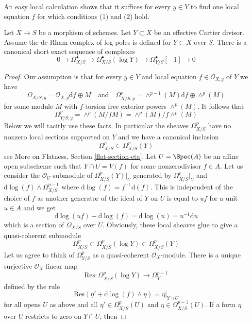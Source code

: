 \noindent
An easy local calculation shows that it suffices for every $y \in Y$
to find one local equation $f$ for which conditions (1) and (2) hold.

\begin{lemma}
\label{lemma-log-complex}
Let $X \to S$ be a morphism of schemes. Let $Y \subset X$ be an
effective Cartier divisor.
Assume the de Rham complex of log poles is defined for $Y \subset X$ over $S$.
There is a canonical short exact sequence
of complexes
$$
0 \to \Omega^\bullet_{X/S} \to
\Omega^\bullet_{X/S}(\log Y) \to
\Omega^\bullet_{Y/S}[-1] \to 0
$$
\end{lemma}

\begin{proof}
Our assumption is that for every $y \in Y$ and local equation
$f \in \mathcal{O}_{X, y}$ of $Y$ we have
$$
\Omega_{X/S, y} = \mathcal{O}_{X, y}\text{d}f \oplus M
\quad\text{and}\quad
\Omega^p_{X/S, y} = \wedge^{p - 1}(M)\text{d}f \oplus \wedge^p(M)
$$
for some module $M$ with $f$-torsion free exterior powers $\wedge^p(M)$.
It follows that
$$
\Omega^p_{Y/S, y} = \wedge^p(M/fM) = \wedge^p(M)/f\wedge^p(M)
$$
Below we will tacitly use these facts.
In particular the sheaves $\Omega^p_{X/S}$ have no nonzero local
sections supported on $Y$ and we have a canonical inclusion
$$
\Omega^p_{X/S} \subset \Omega^p_{X/S}(Y)
$$
see More on Flatness, Section \ref{flat-section-eta}. Let $U = \Spec(A)$
be an affine open subscheme such that $Y \cap U = V(f)$ for some
nonzerodivisor $f \in A$. Let us consider the $\mathcal{O}_U$-submodule
of $\Omega^p_{X/S}(Y)|_U$ generated by
$\Omega^p_{X/S}|_U$ and $\text{d}\log(f) \wedge \Omega^{p - 1}_{X/S}$
where $\text{d}\log(f) = f^{-1}\text{d}(f)$.
This is independent of the choice of $f$ as another generator of the
ideal of $Y$ on $U$ is equal to $uf$ for a unit $u \in A$ and we get
$$
\text{d}\log(uf) - \text{d}\log(f) = \text{d}\log(u) = u^{-1}\text{d}u
$$
which is a section of $\Omega_{X/S}$ over $U$. Obviously, these local
sheaves glue to give a quasi-coherent submodule
$$
\Omega^p_{X/S} \subset \Omega^p_{X/S}(\log Y) \subset \Omega^p_{X/S}(Y)
$$
Let us agree to think of $\Omega^p_{Y/S}$ as a quasi-coherent
$\mathcal{O}_X$-module. There is a unique surjective
$\mathcal{O}_X$-linear map
$$
\text{Res} : \Omega^p_{X/S}(\log Y) \to \Omega^{p - 1}_Y
$$
defined by the rule
$$
\text{Res}(\eta' + \text{d}\log(f) \wedge \eta) = \eta|_{Y \cap U}
$$
for all opens $U$ as above and all
$\eta' \in \Omega^p_{X/S}(U)$ and $\eta \in \Omega^{p - 1}_{X/S}(U)$.
If a form $\eta$ over $U$ restricts to zero on $Y \cap U$, then

\end{proof}
